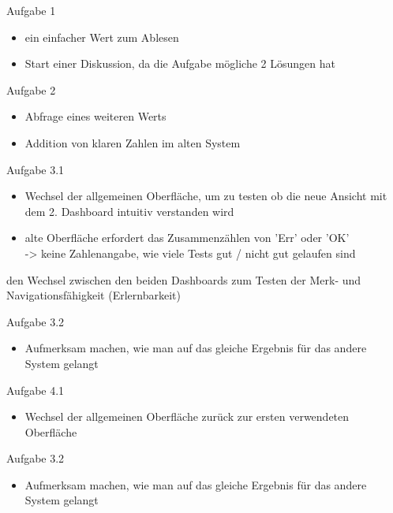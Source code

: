 \noindent
Aufgabe 1
\begin{itemize}
    \item ein einfacher Wert zum Ablesen
    \item Start einer Diskussion, da die Aufgabe mögliche 2 Lösungen hat
\end{itemize}

\noindent
Aufgabe 2
\begin{itemize}
    \item Abfrage eines weiteren Werts
    \item Addition von klaren Zahlen im alten System
\end{itemize}

\noindent
Aufgabe 3.1
\begin{itemize}
    \item Wechsel der allgemeinen Oberfläche, um zu testen ob die neue Ansicht mit dem 2. Dashboard intuitiv verstanden wird
    \item alte Oberfläche erfordert das Zusammenzählen von 'Err' oder 'OK'\\
    -> keine Zahlenangabe, wie viele Tests gut / nicht gut gelaufen sind
\end{itemize}

den Wechsel zwischen den beiden Dashboards zum Testen der Merk- und Navigationsfähigkeit (Erlernbarkeit)

\noindent
Aufgabe 3.2
\begin{itemize}
    \item Aufmerksam machen, wie man auf das gleiche Ergebnis für das andere System gelangt
\end{itemize}

\noindent
Aufgabe 4.1
\begin{itemize}
    \item Wechsel der allgemeinen Oberfläche zurück zur ersten verwendeten Oberfläche
\end{itemize}

\noindent
Aufgabe 3.2
\begin{itemize}
    \item Aufmerksam machen, wie man auf das gleiche Ergebnis für das andere System gelangt
\end{itemize}
